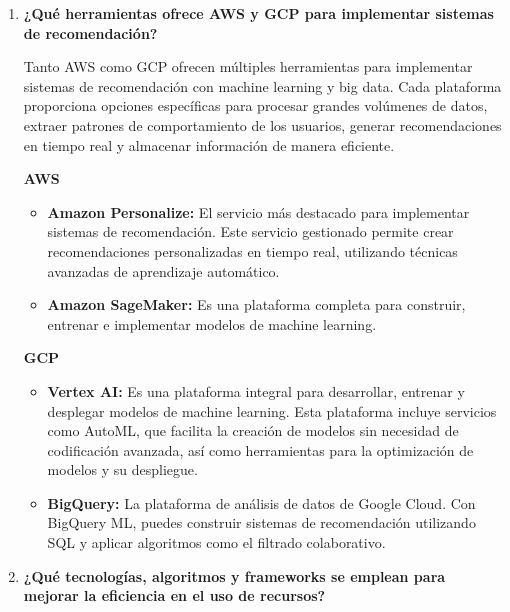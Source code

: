 \documentclass[14pt]{extarticle}
\begin{document}
\begin{enumerate}
    \vspace{0.5cm}
    \item \textbf{¿Qué herramientas ofrece AWS y GCP para implementar sistemas de recomendación?}

    \vspace{0.3cm}
    Tanto AWS como GCP ofrecen múltiples herramientas para implementar sistemas de recomendación con machine learning y big data. Cada plataforma proporciona opciones específicas para procesar grandes volúmenes de datos, extraer patrones de comportamiento de los usuarios, generar recomendaciones en tiempo real y almacenar información de manera eficiente.

    \vspace{0.3cm}
    \textbf{AWS}

    \begin{itemize}
      \item \textbf{Amazon Personalize:} El servicio más destacado para implementar sistemas de recomendación. Este servicio gestionado permite crear recomendaciones personalizadas en tiempo real, utilizando técnicas avanzadas de aprendizaje automático.

      \item \textbf{Amazon SageMaker:} Es una plataforma completa para construir, entrenar e implementar modelos de machine learning.
    \end{itemize}

    \vspace{0.3cm}
    \textbf{GCP}

    \begin{itemize}
      \item \textbf{Vertex AI:} Es una plataforma integral para desarrollar, entrenar y desplegar modelos de machine learning. Esta plataforma incluye servicios como AutoML, que facilita la creación de modelos sin necesidad de codificación avanzada, así como herramientas para la optimización de modelos y su despliegue.

      \item \textbf{BigQuery:} La plataforma de análisis de datos de Google Cloud. Con BigQuery ML, puedes construir sistemas de recomendación utilizando SQL y aplicar algoritmos como el filtrado colaborativo.
    \end{itemize}

    \vspace{0.5cm}
    \item \textbf{¿Qué tecnologías, algoritmos y frameworks se emplean para mejorar la eficiencia en el uso de recursos?}


\end{enumerate}
\end{document}
